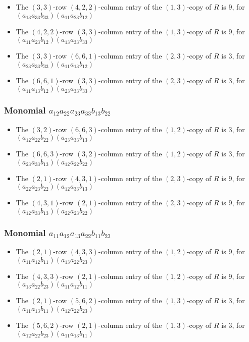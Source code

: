 \documentclass{article}
\begin{document}
\begin{itemize}
\item The $(3, 3)$-row $(4, 2, 2)$-column entry of the $ \left(1, 3\right) $-copy of $R$ is $ 9 $, for $( a_{13} a_{33} b_{33} )( a_{11} a_{23} b_{12} )$ 
\item The $(4, 2, 2)$-row $(3, 3)$-column entry of the $ \left(1, 3\right) $-copy of $R$ is $ 9 $, for $( a_{11} a_{23} b_{12} )( a_{13} a_{33} b_{33} )$ 
\item The $(3, 3)$-row $(6, 6, 1)$-column entry of the $ \left(2, 3\right) $-copy of $R$ is $ 3 $, for $( a_{23} a_{33} b_{33} )( a_{11} a_{13} b_{12} )$ 
\item The $(6, 6, 1)$-row $(3, 3)$-column entry of the $ \left(2, 3\right) $-copy of $R$ is $ 3 $, for $( a_{11} a_{13} b_{12} )( a_{23} a_{33} b_{33} )$ 
\end{itemize}
\subsubsection{Monomial $ a_{12} a_{22} a_{23} a_{33} b_{13} b_{22} $}

\begin{itemize}
\item The $(3, 2)$-row $(6, 6, 3)$-column entry of the $ \left(1, 2\right) $-copy of $R$ is $ 3 $, for $( a_{12} a_{22} b_{22} )( a_{23} a_{33} b_{13} )$ 
\item The $(6, 6, 3)$-row $(3, 2)$-column entry of the $ \left(1, 2\right) $-copy of $R$ is $ 3 $, for $( a_{23} a_{33} b_{13} )( a_{12} a_{22} b_{22} )$ 
\item The $(2, 1)$-row $(4, 3, 1)$-column entry of the $ \left(2, 3\right) $-copy of $R$ is $ 9 $, for $( a_{22} a_{23} b_{22} )( a_{12} a_{33} b_{13} )$ 
\item The $(4, 3, 1)$-row $(2, 1)$-column entry of the $ \left(2, 3\right) $-copy of $R$ is $ 9 $, for $( a_{12} a_{33} b_{13} )( a_{22} a_{23} b_{22} )$ 
\end{itemize}
\subsubsection{Monomial $ a_{11} a_{12} a_{13} a_{22} b_{11} b_{23} $}

\begin{itemize}
\item The $(2, 1)$-row $(4, 3, 3)$-column entry of the $ \left(1, 2\right) $-copy of $R$ is $ 9 $, for $( a_{11} a_{12} b_{11} )( a_{13} a_{22} b_{23} )$ 
\item The $(4, 3, 3)$-row $(2, 1)$-column entry of the $ \left(1, 2\right) $-copy of $R$ is $ 9 $, for $( a_{13} a_{22} b_{23} )( a_{11} a_{12} b_{11} )$ 
\item The $(2, 1)$-row $(5, 6, 2)$-column entry of the $ \left(1, 3\right) $-copy of $R$ is $ 3 $, for $( a_{11} a_{13} b_{11} )( a_{12} a_{22} b_{23} )$ 
\item The $(5, 6, 2)$-row $(2, 1)$-column entry of the $ \left(1, 3\right) $-copy of $R$ is $ 3 $, for $( a_{12} a_{22} b_{23} )( a_{11} a_{13} b_{11} )$ 
\end{itemize}
\end{document}
